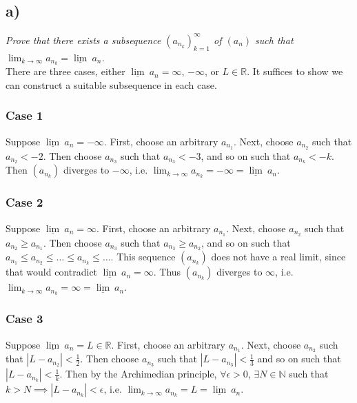 \documentclass[12pt]{article}
\begin{document}
\subsection*{ a)}
{\it Prove that there exists a subsequence $(a_{n_{k}})_{k=1}^{\infty}$ of $(a_n)$ such that $\lim_{k\rightarrow\infty}a_{n_{k}} = \underline{\lim}\ a_n$.} \\

There are three cases, either $\underline{\lim}\ a_n = \infty$, $-\infty$, or $L \in \mathbb{R}$.  It suffices to show we can construct a suitable subsequence in each case.

\subsubsection*{Case 1}

Suppose $\underline{\lim}\ a_n = -\infty$.  First, choose an arbitrary $a_{n_1}$.  Next, choose $a_{n_2}$ such that $a_{n_2} < -2$.  Then choose $a_{n_3}$ such that $a_{n_3} < -3$, and so on such that $a_{n_k} < -k$.  Then $(a_{n_k})$ diverges to $-\infty$, i.e. $\lim_{k\rightarrow\infty}a_{n_{k}} = -\infty = \underline{\lim}\ a_n$.

\subsubsection*{Case 2}

Suppose $\underline{\lim}\ a_n = \infty$.  First, choose an arbitrary $a_{n_1}$.  Next, choose $a_{n_2}$ such that $a_{n_2} \geq a_{n_1}$.  Then choose $a_{n_3}$ such that $a_{n_3} \geq a_{n_2}$, and so on such that $a_{n_1} \leq a_{n_2} \leq \dots \leq a_{n_k} \leq \dots$.  This sequence $(a_{n_k})$ does not have a real limit, since that would contradict $\underline{\lim}\ a_n = \infty$.  Thus $(a_{n_k})$ diverges to $\infty$, i.e. $\lim_{k\rightarrow\infty}a_{n_{k}} = \infty = \underline{\lim}\ a_n$.

\subsubsection*{Case 3}

Suppose $\underline{\lim}\ a_n = L \in \mathbb{R}$.  First, choose an arbitrary $a_{n_1}$.  Next, choose $a_{n_2}$ such that $|L - a_{n_2}| < \frac{1}{2}$.  Then choose $a_{n_3}$ such that $|L - a_{n_3}| < \frac{1}{3}$ and so on such that $|L - a_{n_k}| < \frac{1}{k}$.  Then by the Archimedian principle, $\forall\epsilon > 0$, $\exists N \in \mathbb{N}$ such that $k > N \implies |L - a_{n_k}| < \epsilon$, i.e. $\lim_{k\rightarrow\infty} a_{n_k} = L = \underline{\lim}\ a_n$.
\end{document}
